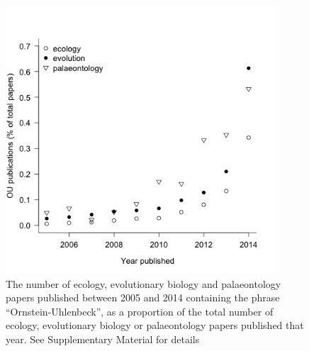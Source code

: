 \documentclass[a4paper,12pt]{article}
\begin{document}
    \begin{figure}[h]
      \centering
      \includegraphics[width=10cm, height=10cm, keepaspectratio=true]{Figures/PapersThruTime.png}
      \caption{The number of ecology, evolutionary biology and palaeontology papers published between 2005 and 2014 containing the phrase ``Ornstein-Uhlenbeck'', as a proportion of the total number of ecology, evolutionary biology or palaeontology papers published that year. See Supplementary Material for details %
      }
      \label{figure.literature}
    \end{figure}
\end{document}
